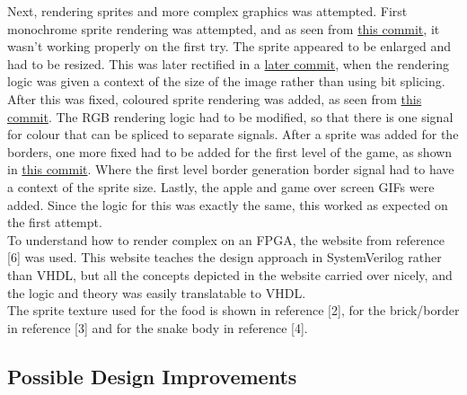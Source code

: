 \documentclass[aps, secnumarabic, balancelastpage, asmath, amssymb, nofootinbib, floatfix,]{revtex4-2}
\begin{document}
{Next, rendering sprites and more complex graphics was attempted. First monochrome sprite rendering was attempted, and as seen from \href{https://cseegit.essex.ac.uk/23-24-ce339/23-24_CE339_gopinath_akshay/-/commit/a958a1af9c4bc434596a061d44baa802a9002064}{this commit}, it wasn't working properly on the first try. The sprite appeared to be enlarged and had to be resized. This was later rectified in a \href{https://cseegit.essex.ac.uk/23-24-ce339/23-24_CE339_gopinath_akshay/-/commit/f787fa3ce0e1d44e9f0805a759b5dafe5140fda9}{later commit}, when the rendering logic was given a context of the size of the image rather than using bit splicing. After this was fixed, coloured sprite rendering was added, as seen from \href{https://cseegit.essex.ac.uk/23-24-ce339/23-24_CE339_gopinath_akshay/-/commit/4a8f2602f10cfca06351e9e81d6a3dccfbe525a5}{this commit}. The RGB rendering logic had to be modified, so that there is one signal for colour that can be spliced to separate signals. After a sprite was added for the borders, one more fixed had to be added for the first level of the game, as shown in \href{https://cseegit.essex.ac.uk/23-24-ce339/23-24_CE339_gopinath_akshay/-/commit/72ade113022557aec48fa33dec5331c03ee3bdc1}{this commit}. Where the first level border generation border signal had to have a context of the sprite size. Lastly, the apple and game over screen GIFs were added. Since the logic for this was exactly the same, this worked as expected on the first attempt. ~\\

To understand how to render complex on an FPGA, the website from reference [6] was used. This website teaches the design approach in SystemVerilog rather than VHDL, but all the concepts depicted in the website carried over nicely, and the logic and theory was easily translatable to VHDL. ~\\

The sprite texture used for the food is shown in reference [2], for the brick/border in reference [3] and for the snake body in reference [4].

\vspace{-0.5em}
\subsection{\fontsize{11.4pt}{12pt}\selectfont \bf Possible Design Improvements \label{sec:2.4}}

}
\end{document}
